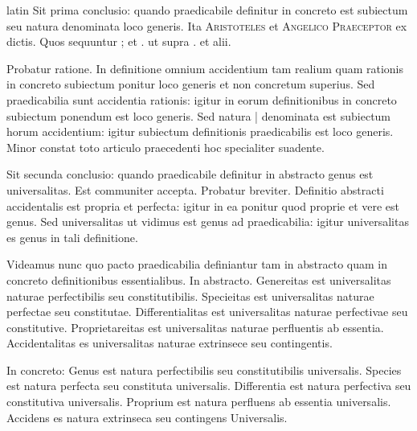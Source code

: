 \begin{otherlanguage*}{latin}
\pstart
Sit prima conclusio:
quando praedicabile definitur in concreto est subiectum seu natura denominata loco generis. Ita \textsc{Aristoteles} et \textsc{Angelico Praeceptor} ex dictis. Quos sequuntur ;  et .  ut supra .  et alii. 
\pend

\pstart
Probatur ratione. In definitione omnium accidentium tam realium quam rationis in concreto subiectum ponitur loco generis et non concretum superius. Sed praedicabilia sunt accidentia rationis:
igitur in eorum definitionibus in concreto subiectum ponendum est loco generis. Sed natura \textnormal{|} denominata est subiectum horum accidentium:
igitur subiectum definitionis praedicabilis est loco generis. Minor constat toto articulo praecedenti hoc specialiter suadente. 
\pend

\pstart
Sit secunda conclusio:
quando praedicabile definitur in abstracto genus est universalitas. Est communiter accepta. Probatur breviter. Definitio abstracti accidentalis est propria et perfecta:
igitur in ea ponitur quod proprie et vere est genus. Sed universalitas ut vidimus est genus ad praedicabilia:
igitur universalitas es genus in tali definitione. 
\pend

\pstart
Videamus nunc quo pacto praedicabilia definiantur tam in abstracto quam in concreto definitionibus essentialibus. In abstracto. Genereitas est universalitas naturae perfectibilis seu constitutibilis. Specieitas est universalitas naturae perfectae seu constitutae. Differentialitas est universalitas naturae perfectivae seu constitutive. Proprietareitas est universalitas naturae perfluentis ab essentia. Accidentalitas es universalitas naturae extrinsece seu contingentis. 
\pend

\pstart
In concreto:
Genus est natura perfectibilis seu constitutibilis universalis. Species est natura perfecta seu constituta universalis. Differentia est natura perfectiva seu constitutiva universalis. Proprium est natura perfluens ab essentia universalis. Accidens es natura extrinseca seu contingens Universalis. 
\pend


\end{otherlanguage*}

